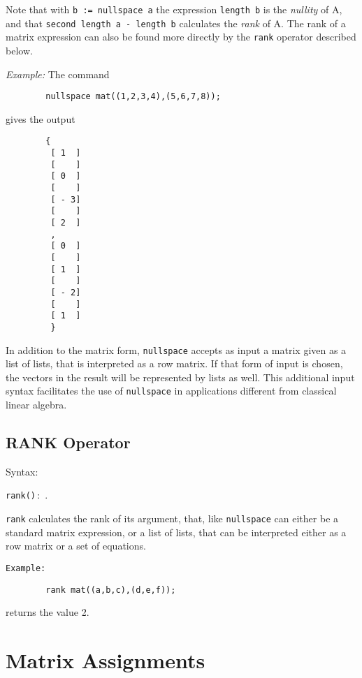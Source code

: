 Note that with \texttt{b := nullspace a} the expression \texttt{length b} is 
the \emph{nullity} of A, and that \texttt{second length a - length b} 
calculates the \emph{rank} of A.  The rank of a matrix expression can also
be found more directly by the \texttt{rank} operator described below.

\textit{Example:} The command
\begin{verbatim}
        nullspace mat((1,2,3,4),(5,6,7,8));
\end{verbatim}
   gives the output
 
\begin{verbatim}
        {
         [ 1  ]
         [    ]
         [ 0  ]
         [    ]
         [ - 3]
         [    ]
         [ 2  ]
         ,
         [ 0  ]
         [    ]
         [ 1  ]
         [    ]
         [ - 2]
         [    ]
         [ 1  ]
         }
\end{verbatim}
 
In addition to the {\REDUCE} matrix form, \texttt{nullspace} accepts as input a
matrix given as a list of lists, that is interpreted as a row matrix.  If
that form of input is chosen, the vectors in the result will be
represented by lists as well.  This additional input syntax facilitates
the use of \texttt{nullspace} in applications different from classical linear
algebra.

\subsection{RANK Operator}
\hypertarget{operator:RANK}{}
 
Syntax:
\begin{syntax}
        \texttt{rank(}\texttt{)}\,:\, .
\end{syntax}
\texttt{rank} calculates the rank of its argument, that, like \texttt{nullspace}
can either be a standard matrix expression, or a list of lists, that can
be interpreted either as a row matrix or a set of equations.

\texttt{Example:}
\begin{verbatim}
        rank mat((a,b,c),(d,e,f));
\end{verbatim}
returns the value 2.

\section{Matrix Assignments} 

